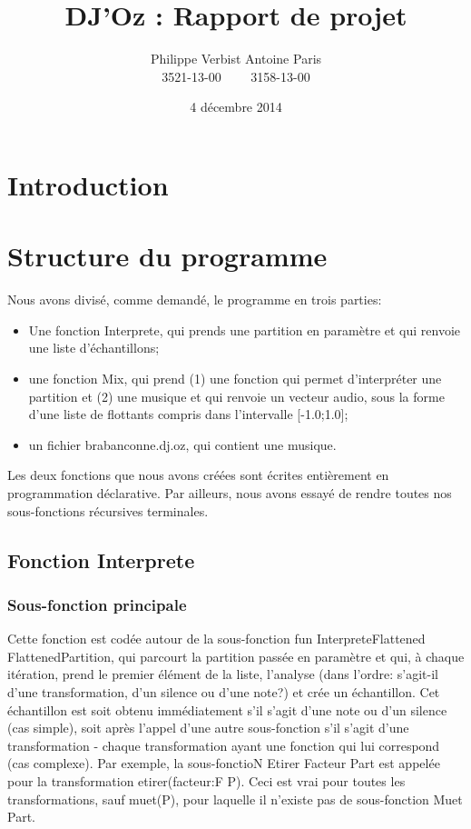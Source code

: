 \documentclass[12pt,a4paper]{article}
\author{Philippe Verbist  Antoine Paris\\3521-13-00 \ \ \ \ 3158-13-00}
\title{DJ'Oz : Rapport de projet}
\date{4 décembre 2014}
\begin{document}
\maketitle

\section{Introduction}

\section{Structure du programme}

Nous avons divisé, comme demandé, le programme en trois parties:
\begin{itemize}
	\item Une fonction Interprete, qui prends une partition en 	paramètre et qui renvoie une liste d'échantillons;
	\item une fonction Mix, qui prend (1) une fonction qui permet d'interpréter une partition  et (2) 
				une musique et qui renvoie un vecteur audio, sous la forme d'une liste de flottants compris dans l'intervalle [-1.0;1.0];
	\item un fichier brabanconne.dj.oz, qui contient une musique.
\end{itemize}

Les deux fonctions que nous avons créées sont écrites entièrement en programmation déclarative. Par ailleurs, nous avons essayé de rendre toutes nos sous-fonctions récursives terminales.

\subsection{Fonction Interprete}
\subsubsection{Sous-fonction principale}
Cette fonction est codée autour de la sous-fonction fun {InterpreteFlattened FlattenedPartition},
 qui parcourt la partition passée en paramètre et qui, à chaque itération, prend le premier
élément de la liste, l'analyse (dans l'ordre: s'agit-il d'une transformation, d'un silence ou d'une note?)
 et crée un échantillon. Cet échantillon est soit obtenu immédiatement s'il s'agit d'une note ou d'un
silence (cas simple), soit après l'appel d'une autre sous-fonction s'il s'agit d'une transformation -
chaque transformation ayant une fonction qui lui correspond (cas complexe). Par exemple, la sous-fonctioN
{Etirer Facteur Part} est appelée pour la transformation etirer(facteur:F P). Ceci est vrai pour toutes
les transformations, sauf muet(P), pour laquelle il n'existe pas de sous-fonction {Muet Part}.
\end{document}
